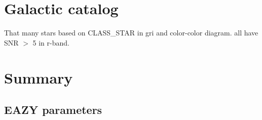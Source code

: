 \documentclass[apj,iop]{emulateapj}
\begin{document}


\section{Galactic catalog}

That many stars based on CLASS\_STAR in gri and color-color diagram. all have SNR $>$ 5 in r-band.

\section{Summary}

\acknowledgements

{}
%

\newpage
\appendix

\subsection{EAZY parameters}
\end{document}
